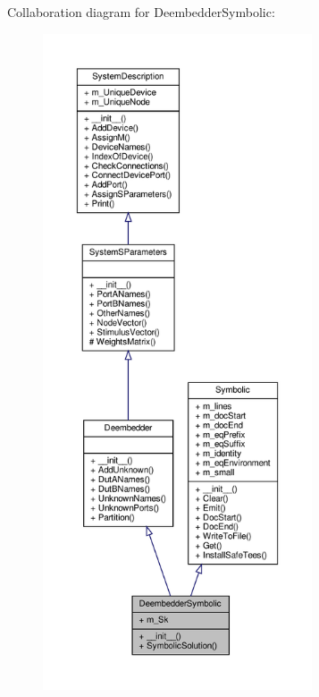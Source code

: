 Collaboration diagram for Deembedder\+Symbolic\+:
\nopagebreak
\begin{figure}[H]
\begin{center}
\leavevmode
\includegraphics[height=550pt]{classSignalIntegrity_1_1SystemDescriptions_1_1DeembedderSymbolic_1_1DeembedderSymbolic__coll__graph}
\end{center}
\end{figure}
